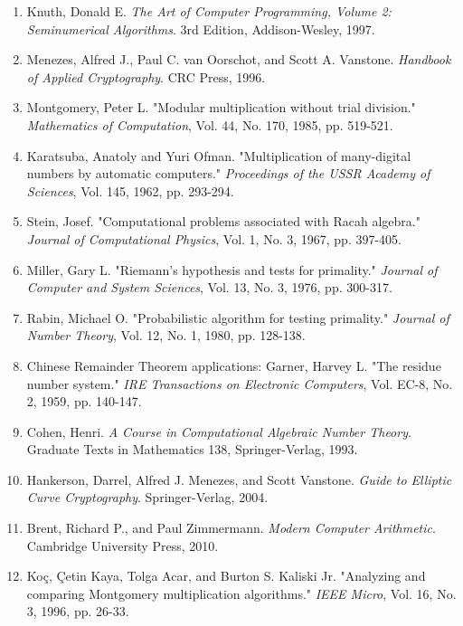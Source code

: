 \documentclass[12pt,a4paper]{article}
\theoremstyle{definition}
\begin{document}
\begin{enumerate}
    \item Knuth, Donald E. \textit{The Art of Computer Programming, Volume 2: Seminumerical Algorithms}. 3rd Edition, Addison-Wesley, 1997.
    
    \item Menezes, Alfred J., Paul C. van Oorschot, and Scott A. Vanstone. \textit{Handbook of Applied Cryptography}. CRC Press, 1996.
    
    \item Montgomery, Peter L. "Modular multiplication without trial division." \textit{Mathematics of Computation}, Vol. 44, No. 170, 1985, pp. 519-521.
    
    \item Karatsuba, Anatoly and Yuri Ofman. "Multiplication of many-digital numbers by automatic computers." \textit{Proceedings of the USSR Academy of Sciences}, Vol. 145, 1962, pp. 293-294.
    
    \item Stein, Josef. "Computational problems associated with Racah algebra." \textit{Journal of Computational Physics}, Vol. 1, No. 3, 1967, pp. 397-405.
    
    \item Miller, Gary L. "Riemann's hypothesis and tests for primality." \textit{Journal of Computer and System Sciences}, Vol. 13, No. 3, 1976, pp. 300-317.
    
    \item Rabin, Michael O. "Probabilistic algorithm for testing primality." \textit{Journal of Number Theory}, Vol. 12, No. 1, 1980, pp. 128-138.
    
    \item Chinese Remainder Theorem applications: Garner, Harvey L. "The residue number system." \textit{IRE Transactions on Electronic Computers}, Vol. EC-8, No. 2, 1959, pp. 140-147.
    
    \item Cohen, Henri. \textit{A Course in Computational Algebraic Number Theory}. Graduate Texts in Mathematics 138, Springer-Verlag, 1993.
    
    \item Hankerson, Darrel, Alfred J. Menezes, and Scott Vanstone. \textit{Guide to Elliptic Curve Cryptography}. Springer-Verlag, 2004.
    
    \item Brent, Richard P., and Paul Zimmermann. \textit{Modern Computer Arithmetic}. Cambridge University Press, 2010.
    
    \item Koç, Çetin Kaya, Tolga Acar, and Burton S. Kaliski Jr. "Analyzing and comparing Montgomery multiplication algorithms." \textit{IEEE Micro}, Vol. 16, No. 3, 1996, pp. 26-33.
\end{enumerate}
\end{document}
